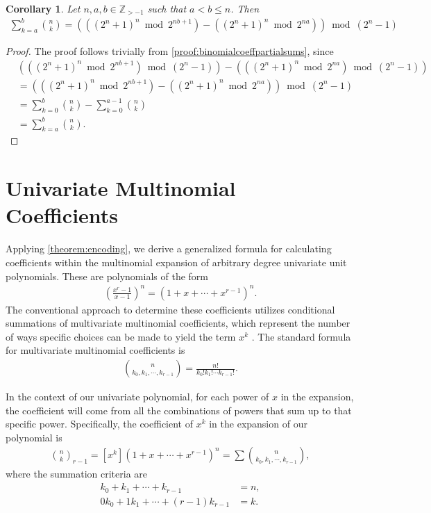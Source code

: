 \documentclass{article}
\theoremstyle{plain}
\newtheorem{corollary}[theorem]{Corollary}
\theoremstyle{definition}
\newcommand{\Z}{\mathbb{Z}}
\begin{document}
\begin{corollary}
Let $n,a,b \in \Z_{>-1}$ such that $a < b \leq n$. Then
\begin{align*}
\sum_{k=a}^{b} \binom{n}{k}
=
\left(
    \left( (2^n+1)^n \bmod 2^{nb+1} \right)
    - \left( (2^n+1)^n \bmod 2^{na} \right)
\right)
\bmod (2^n-1) 
\end{align*}
\end{corollary}
\begin{proof}
The proof follows trivially from \cref{proof:binomialcoeffpartialsums}, since
\begin{align*}
& \left(\left( (2^n+1)^n \bmod 2^{nb+1} \right) \bmod (2^n-1)\right)
- \left(\left( (2^n+1)^n \bmod 2^{na} \right) \bmod (2^n-1)\right)
 \\
&= \left(
    \left( (2^n+1)^n \bmod 2^{nb+1} \right)
    - \left( (2^n+1)^n \bmod 2^{na} \right)
\right)
\bmod (2^n-1) \\
&= \sum_{k=0}^{b} \binom{n}{k} - \sum_{k=0}^{a-1} \binom{n}{k} \\
&= \sum_{k=a}^{b} \binom{n}{k} .
\end{align*}
\end{proof}

\section{Univariate Multinomial Coefficients} \label{section:multinomialformula}
Applying \cref{theorem:encoding}, we derive a generalized formula for calculating coefficients within the multinomial expansion of arbitrary degree univariate unit polynomials. These are polynomials of the form
\begin{align*}
    \left(\frac{x^{r}-1}{x-1}\right)^n = (1 + x + \cdots + x^{r-1})^n  .
\end{align*}
The conventional approach to determine these coefficients utilizes conditional summations of multivariate multinomial coefficients, which represent the number of ways specific choices can be made to yield the term \(x^k\) \cite{graham1994concrete}. The standard formula for multivariate multinomial coefficients is
\begin{align*}
    \binom{n}{k_0, k_1, \cdots, k_{r-1}} = \frac{n!}{k_0! k_1! \cdots k_{r-1}!} .
\end{align*}

In the context of our univariate polynomial, for each power of \(x\) in the expansion, the coefficient will come from all the combinations of powers that sum up to that specific power. Specifically, the coefficient of \(x^k\) in the expansion of our polynomial is \cite{brualdi2010intro}
\begin{align*}
    \binom{n}{k}_{r-1} = [x^k](1 + x + \cdots + x^{r-1})^n = \sum \binom{n}{k_0, k_1, \cdots, k_{r-1}} ,
\end{align*}
where the summation criteria are
\begin{align*}
    k_0 + k_1 + \cdots + k_{r-1} &= n , \\
    0 k_0 + 1 k_1 + \cdots + (r-1) k_{r-1} &= k .
\end{align*}
\end{document}
